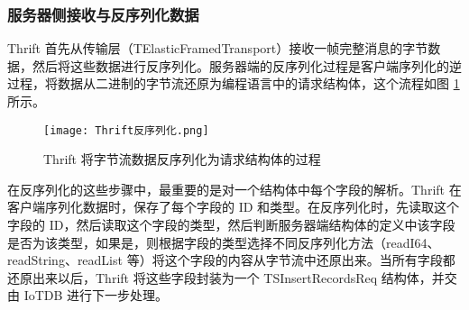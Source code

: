 \subsubsection{服务器侧接收与反序列化数据}
Thrift 首先从传输层（TElasticFramedTransport）接收一帧完整消息的字节数据，然后将这些数据进行反序列化。服务器端的反序列化过程是客户端序列化的逆过程，将数据从二进制的字节流还原为编程语言中的请求结构体，这个流程如图 \ref{fig:thrift-deserialize} 所示。
\begin{figure}
  \centering
  \texttt{[image: Thrift反序列化.png]}
  \caption{Thrift 将字节流数据反序列化为请求结构体的过程}
  \label{fig:thrift-deserialize}
\end{figure}

在反序列化的这些步骤中，最重要的是对一个结构体中每个字段的解析。Thrift 在客户端序列化数据时，保存了每个字段的 ID 和类型。在反序列化时，先读取这个字段的 ID，然后读取这个字段的类型，然后判断服务器端结构体的定义中该字段是否为该类型，如果是，则根据字段的类型选择不同反序列化方法（readI64、readString、readList 等）将这个字段的内容从字节流中还原出来。当所有字段都还原出来以后，Thrift 将这些字段封装为一个 TSInsertRecordsReq 结构体，并交由 IoTDB 进行下一步处理。
